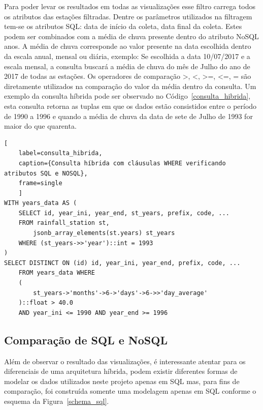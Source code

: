 \documentclass[article,11pt,oneside,a4paper]{abntex2} %
\begin{document}
	Para poder levar os resultados em todas as visualizações esse filtro carrega todos os atributos das estações filtradas. Dentre os parâmetros utilizados na filtragem tem-se os atributos SQL: data de início da coleta, data final da coleta. Estes podem ser combinados com a média de chuva presente dentro do atributo NoSQL anos. A média de chuva corresponde ao valor presente na data escolhida dentro da escala anual, mensal ou diária, exemplo: Se escolhida a data 10/07/2017 e a escala mensal, a consulta buscará a média de chuva do mês de Julho do ano de 2017 de todas as estações. Os operadores de comparação \textgreater, \textless, \textgreater=, \textless=, = são diretamente utilizados na comparação do valor da média dentro da consulta. Um exemplo da consulta híbrida pode ser observado no Código~\ref{consulta_hibrida}, esta consulta retorna as tuplas em que os dados estão consistidos entre o período de 1990 a 1996 e quando a média de chuva da data de sete de Julho de 1993 for maior do que quarenta.

		\begin{lstlisting}[
	label=consulta_hibrida,
	caption={Consulta híbrida com cláusulas WHERE verificando atributos SQL e NOSQL},
	frame=single
	]
WITH years_data AS (
	SELECT id, year_ini, year_end, st_years, prefix, code, ...
	FROM rainfall_station st, 
		jsonb_array_elements(st.years) st_years
	WHERE (st_years->>'year')::int = 1993
)
SELECT DISTINCT ON (id) id, year_ini, year_end, prefix, code, ...
	FROM years_data WHERE
	(
		st_years->'months'->6->'days'->6->>'day_average'
	)::float > 40.0
	AND year_ini <= 1990 AND year_end >= 1996
	\end{lstlisting}

	\subsection{Comparação de SQL e NoSQL}
		\hspace{13pt}
	Além de observar o resultado das visualizações, é interessante atentar para os diferenciais de uma arquitetura híbrida, podem existir diferentes formas de modelar os dados utilizados neste projeto apenas em SQL mas, para fins de comparação, foi construída somente uma modelagem apenas em SQL conforme o esquema da Figura~\ref{schema_sql}.
	
\end{document}
